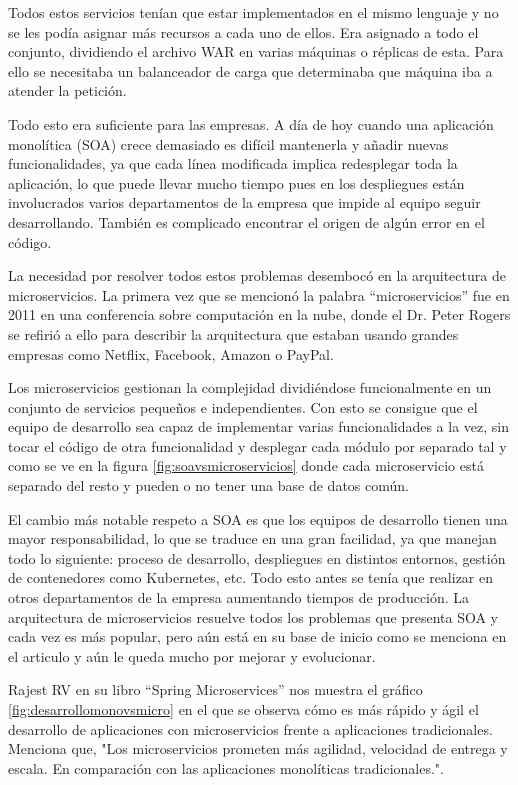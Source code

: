 \documentclass[12pt]{report} %
\begin{document}
Todos estos servicios tenían que estar implementados en el mismo lenguaje y no se les podía asignar más recursos a cada uno de ellos. Era asignado a todo el conjunto, dividiendo el archivo WAR en varias máquinas o réplicas de esta. Para ello se necesitaba un balanceador de carga que determinaba que máquina iba a atender la petición.

Todo esto era suficiente para las empresas. A día de hoy cuando una aplicación monolítica (SOA) crece demasiado es difícil mantenerla y añadir nuevas funcionalidades, ya que cada línea modificada implica redesplegar toda la aplicación, lo que puede llevar mucho tiempo pues en los despliegues están involucrados varios departamentos de la empresa que impide al equipo seguir desarrollando. También es complicado encontrar el origen de algún error en el código.

La necesidad por resolver todos estos problemas desembocó en la arquitectura de microservicios. La primera vez que se mencionó la palabra “microservicios” fue en 2011 en una conferencia sobre computación en la nube, donde el Dr. Peter Rogers\cite{breveHistoria} se refirió a ello para describir la arquitectura que estaban usando grandes empresas como Netflix, Facebook, Amazon o PayPal. 

Los microservicios gestionan la complejidad dividiéndose funcionalmente en un conjunto de servicios pequeños e independientes. Con esto se consigue que el equipo de desarrollo sea capaz de implementar varias funcionalidades a la vez, sin tocar el código de otra funcionalidad y desplegar cada módulo por separado tal y como se ve en la figura \ref{fig:soavsmicroservicios} donde cada microservicio está separado del resto y pueden o no tener una base de datos común.

El cambio más notable respeto a SOA es que los equipos de desarrollo tienen una mayor responsabilidad, lo que se traduce en una gran facilidad, ya que manejan todo lo siguiente:  proceso de desarrollo, despliegues en distintos entornos, gestión de contenedores como Kubernetes, etc. Todo esto antes se tenía que realizar en otros departamentos de la empresa aumentando tiempos de producción. La arquitectura de microservicios resuelve todos los problemas que presenta SOA y cada vez es más popular, pero aún está en su base de inicio como se menciona en el articulo \cite{Dragoni2017} y aún le queda mucho por mejorar y evolucionar. 

Rajest RV en su libro “Spring Microservices” \cite{rv2016spring} nos muestra el gráfico \ref{fig:desarrollomonovsmicro} en el que se observa cómo es más rápido y ágil el desarrollo de aplicaciones con microservicios frente a aplicaciones tradicionales. Menciona que, "Los microservicios prometen más agilidad, velocidad de entrega y escala. En comparación con las aplicaciones monolíticas tradicionales.". 
\end{document}
